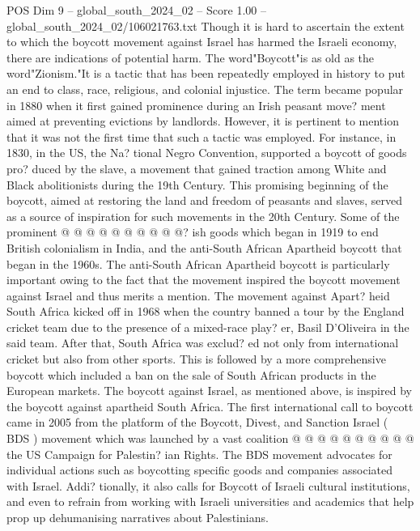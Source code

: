 \begin{textsample}{POS Dim 9 – global\_south\_2024\_02 – Score 1.00 – global\_south\_2024\_02/106021763.txt}  \label{ex:f9_pos_095}
Though it is hard to ascertain the extent to which the boycott movement against Israel has harmed the Israeli economy, there are indications of potential harm.
The word"Boycott"is as old as the word"Zionism."It is a tactic that has been repeatedly employed in history to put an end to class, race, religious, and colonial injustice.
The term became popular in 1880 when it first gained prominence during an Irish peasant move? ment aimed at preventing evictions by landlords.
However, it is pertinent to mention that it was not the first time that such a tactic was employed.
For instance, in 1830, in the US, the Na? tional Negro Convention, supported a boycott of goods pro? duced by the slave, a movement that gained traction among White and Black abolitionists during the 19th Century.
This promising beginning of the boycott, aimed at restoring the land and freedom of peasants and slaves, served as a source of inspiration for such movements in the 20th Century.
Some of the prominent @ @ @ @ @ @ @ @ @ @? ish goods which began in 1919 to end British colonialism in India, and the anti-South African Apartheid boycott that began in the 1960s.
The anti-South African Apartheid boycott is particularly important owing to the fact that the movement inspired the boycott movement against Israel and thus merits a mention.
The movement against Apart? heid South Africa kicked off in 1968 when the country banned a tour by the England cricket team due to the presence of a mixed-race play? er, Basil D'Oliveira in the said team.
After that, South Africa was exclud? ed not only from international cricket but also from other sports.
This is followed by a more comprehensive boycott which included a ban on the sale of South African products in the European markets.
The boycott against Israel, as mentioned above, is inspired by the boycott against apartheid South Africa.
The first international call to boycott came in 2005 from the platform of the Boycott, Divest, and Sanction Israel ( BDS ) movement which was launched by a vast coalition @ @ @ @ @ @ @ @ @ @ the US Campaign for Palestin? ian Rights.
The BDS movement advocates for individual actions such as boycotting specific goods and companies associated with Israel.
Addi? tionally, it also calls for Boycott of Israeli cultural institutions, and even to refrain from working with Israeli universities and academics that help prop up dehumanising narratives about Palestinians.

\end{textsample}
